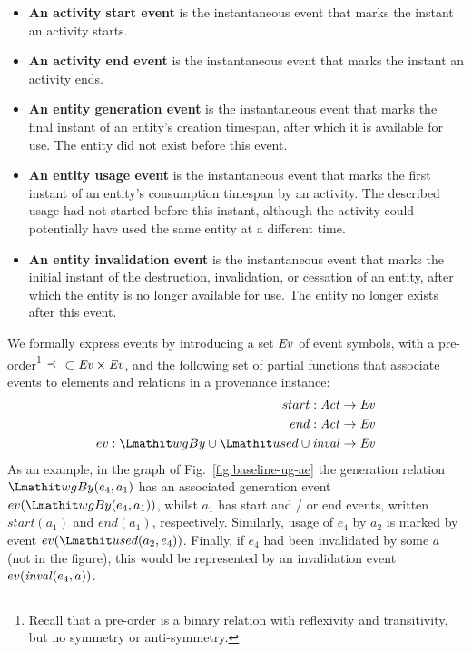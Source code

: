 \begin{itemize} %
	\item\textbf{An activity start event} is the instantaneous event that marks the instant an activity starts.
	
	\item\textbf{An activity end event} is the instantaneous event that marks the instant an activity ends.
	
	\item\textbf{An entity generation event} is the instantaneous event that marks the final instant of an entity's creation timespan, after which it is available for use. The entity did not exist before this event.
	
	\item\textbf{An entity usage event}  is the instantaneous event that marks the first instant of an entity's consumption timespan by an activity. The described usage had not started before this instant, although the activity could potentially have used the same entity at a different time.
	
	\item\textbf{An entity invalidation event} is the instantaneous event that marks the initial instant of the destruction, invalidation, or cessation of an entity, after which the entity is no longer available for use. The entity no longer exists after this event.
	
\end{itemize}

We formally express events by introducing a set $\mathit{Ev}$ of event symbols, with a pre-order\footnote{Recall that a pre-order is a binary relation with reflexivity and transitivity, but no symmetry or anti-symmetry.} $\preceq ~~\subset \mathit{Ev} \times \mathit{Ev}$, and the following set of partial functions that associate events to elements and relations in a provenance instance:
\begin{align*}
start: \act \rightarrow \Ev \\
end: \act \rightarrow \Ev \\
ev: \wgby \cup \used \cup \inv \rightarrow \Ev
\end{align*}	
As an example, in the graph of Fig.~\ref{fig:baseline-ug-ae} the generation relation $\wgby(e_4, a_1)$ has an associated generation event $ev(\wgby(e_4, a_1))$, whilst $a_1$ has start and / or end events, written $start(a_1)$ and $end(a_1)$, respectively. Similarly, usage of $e_4$ by $a_2$ is marked by event $ev(\used(a_2, e_4))$. Finally, if $e_4$ had been invalidated by some $a$ (not in the figure), this would be represented by an invalidation event $ev(\mathit{inval}(e_4,a))$.

